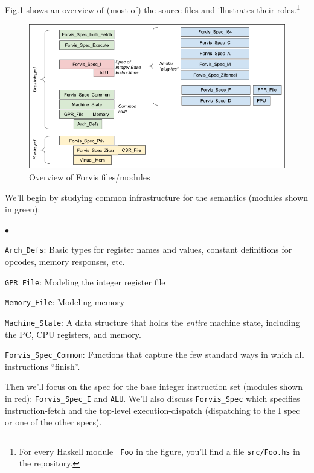 \documentclass[11pt]{article}
\newenvironment{tightlist}%
{\begin{list}{$\bullet$}{%
    \setlength{\topsep}{0in}
    \setlength{\partopsep}{0in}
    \setlength{\itemsep}{0in}
    \setlength{\parsep}{0in}
    \setlength{\leftmargin}{1.5em}
    \setlength{\rightmargin}{0in}
    \setlength{\itemindent}{0in}
}
}%
{\end{list}
}
\begin{document}
Fig.\ref{Fig_Overview} shows an overview of (most of) the source files
and illustrates their roles.\footnote{For every Haskell module {\tt
Foo} in the figure, you'll find a file {\tt src/Foo.hs} in the
repository.}
\begin{figure}[htbp]
    \centering
    \includegraphics[width=6in]{Figs/Fig_Overview}
    \caption{\label{Fig_Overview}
                    Overview of Forvis files/modules}
\end{figure}
We'll begin by studying common infrastructure for the semantics (modules shown in green):
\begin{tightlist}

\item \verb|Arch_Defs|: Basic types for register names and values, constant definitions for opcodes, memory responses, etc.

\item \verb|GPR_File|: Modeling the integer register file

\item \verb|Memory_File|: Modeling memory

\item \verb|Machine_State|: A data structure that holds the
\emph{entire} machine state, including the PC, CPU registers, and memory.

\item \verb|Forvis_Spec_Common|: Functions that capture the few standard ways in which all instructions ``finish''.

\end{tightlist}

Then we'll focus on the spec for the base integer instruction set
(modules shown in red): \verb|Forvis_Spec_I| and \verb|ALU|.  We'll
also discuss \verb|Forvis_Spec| which specifies instruction-fetch and
the top-level execution-dispatch (dispatching to the I spec or one of
the other specs).
\end{document}
